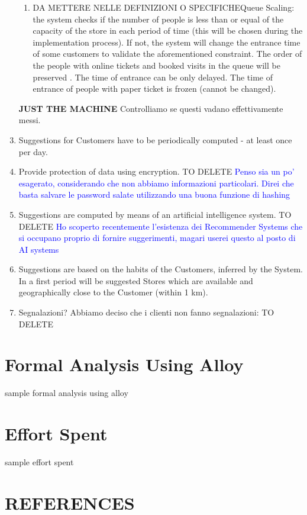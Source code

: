 \documentclass[a4paper, 10pt, oneside]{article}
\newcommand*{\lorenzo}[1]{\textcolor{BurntOrange}{#1}}
\newcommand{\giovanni}[1]{\textcolor{Blue}{#1}}
\begin{document}
\begin{enumerate}[align=left]
\begin{enumerate}[label={-}]
        \item \lorenzo{DA METTERE NELLE DEFINIZIONI O SPECIFICHE}Queue Scaling: the system checks if the number of people is less than or equal of the capacity of the store in each period of time (this will be chosen during the implementation process). If not, the system will change the entrance time of some customers to validate the aforementioned constraint. The order of the people with online tickets and booked visits in the queue will be preserved . The time of entrance can be only delayed. The time of entrance of people with paper ticket is frozen (cannot be changed).
    \end{enumerate}
    
    \item[\textbf{JUST THE MACHINE}] \lorenzo{Controlliamo se questi vadano effettivamente messi.}
    \item \label{req:periodicallyComputeSuggestion}Suggestions for Customers have to be periodically computed - at least once per day.
    \item Provide protection of data using encryption. \lorenzo{TO DELETE} \giovanni {Penso sia un po' esagerato, considerando che non abbiamo informazioni particolari. Direi che basta salvare le password salate utilizzando una buona funzione di hashing}  %
    \item Suggestions are computed by means of an artificial intelligence system. \lorenzo{TO DELETE}  \giovanni{Ho scoperto recentemente l'esistenza dei Recommender Systems che si occupano proprio di fornire suggerimenti, magari userei questo al posto di AI systems}  %
    \item \label{req:inferringSuggestions}Suggestions are based on the habits of the Customers, inferred by the System. In a first period will be suggested Stores which are available and geographically close to the Customer (within 1 km). 
    
    
    \item \lorenzo{Segnalazioni?} \lorenzo{Abbiamo deciso che i clienti non fanno segnalazioni: TO DELETE}
\end{enumerate}


\section{Formal Analysis Using Alloy}
\label{analysisAndAlloy}
sample formal analysis using alloy

\section{Effort Spent}
\label{effort}
sample effort spent

\section{REFERENCES}
\label{references}
\renewcommand{\refname}{}
\vspace{-2.6em}
\nocite{*}
 

\end{document}
